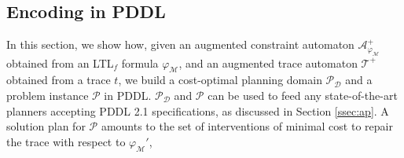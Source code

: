 \subsection{Encoding in PDDL}\label{ssec:eip}

\newcommand{\myi}{\emph{(i)}\xspace}
\newcommand{\myii}{\emph{(ii)}\xspace}
\newcommand{\myiii}{\emph{(iii)}\xspace}
\newcommand{\myiv}{\emph{(iv)}\xspace}
\newcommand{\myv}{\emph{(v)}\xspace}
\newcommand{\myvi}{\emph{(vi)}\xspace}
\newcommand{\A}{\mathcal{A}}
\newcommand{\T}{\mathcal{T}}
\newcommand{\PDDL}[1]{\begin{footnotesize}\texttt{#1}\end{footnotesize}}

In this section, we show how, given an augmented constraint automaton $\mathcal{A}_{\varphi_{\mathcal{M}}}^+$ obtained from an LTL$_f$ formula  $\varphi_{\mathcal{M}}$, and an augmented trace automaton $\T^+$ obtained from a trace $t$, we build a cost-optimal planning domain $\mathcal{P_D}$ and a problem instance $\mathcal{P}$ in PDDL. $\mathcal{P_D}$ and $\mathcal{P}$ can be used to feed any state-of-the-art planners accepting PDDL 2.1 specifications, as discussed in Section \ref{ssec:ap}.
%
A solution plan for $\mathcal{P}$ amounts to the set of interventions of minimal cost to repair the trace with respect to $\varphi_{\mathcal{M}}'$,

